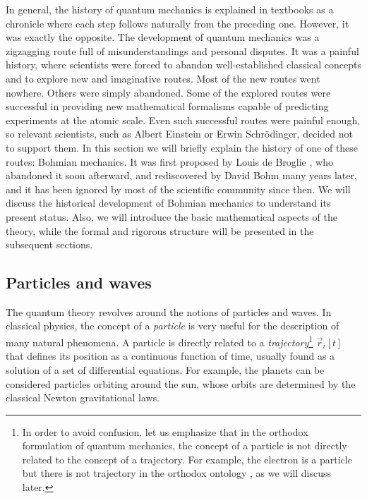 \documentclass[nofootinbib, secnumarabic, amsmath, nobibnotes,10pt,aps,pra]{revtex4-1}
\begin{document}
In general, the history of quantum mechanics is explained in
textbooks as a chronicle where each step follows naturally from the
preceding one. However, it was exactly the opposite. The
development of quantum mechanics was a zigzagging route full of
misunderstandings and personal disputes. It was a painful history, where scientists were
forced to abandon well-established classical concepts and to explore
new and imaginative routes. Most of the new routes went nowhere.
Others were simply abandoned. Some of the explored routes were
successful in providing new mathematical formalisms capable of
predicting experiments at the atomic scale. Even such successful
routes were painful enough, so relevant scientists, such as Albert
Einstein or Erwin Schr\"odinger, decided not to support them. In
this section we will briefly explain the history of one of these
routes: Bohmian mechanics. It was first proposed by Louis de Broglie
\cite{om.debroglie1923}, who abandoned it soon afterward, and
rediscovered by David Bohm \cite{om.bohm1952a,om.bohm1952b} many years
later, and it has been ignored by most of the scientific community
since then. We will discuss the historical development of
Bohmian mechanics to understand its present status. Also, we will
introduce the basic mathematical aspects of the theory, while the
formal and rigorous structure will be presented in the subsequent 
sections.

\subsection{Particles and waves}\label{om.sec_intro.1}

The quantum theory revolves around the notions of particles and waves.
In classical physics, the concept of a \textit{particle} is very
useful for the description of many natural phenomena. A particle is
directly related to a \textit{trajectory}\footnote{In order to avoid
confusion, let us emphasize that in the orthodox formulation of
quantum mechanics, the concept of a particle is not directly related
to the concept of a trajectory. For example, the electron is a
particle but there is not trajectory in the orthodox ontology , as we will discuss
later.} $\vec{r}_{i}[t]$ that defines its position as a continuous
function of time, usually found as a solution of a set of
differential equations. For example, the planets can be considered
particles orbiting around the sun, whose orbits are determined by
the classical Newton gravitational laws.
\end{document}
